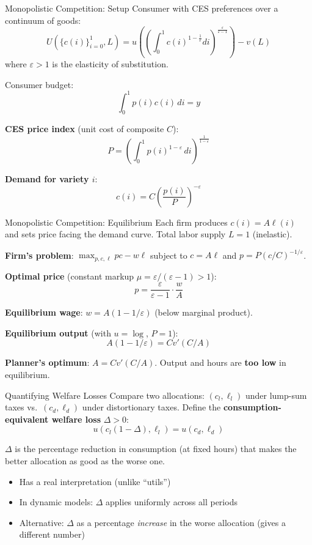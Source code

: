 \documentclass[blue]{beamer}
\begin{document}
\begin{frame}{Monopolistic Competition: Setup}
	Consumer with CES preferences over a continuum of goods:
	\[
	U\!\left(\{c(i)\}_{i=0}^1, L\right) = u\!\left(\left(\int_0^1 c(i)^{1-\frac{1}{\varepsilon}} di\right)^{\frac{\varepsilon}{\varepsilon-1}}\right) - v(L)
	\]
	where $\varepsilon > 1$ is the elasticity of substitution.
	
	
	Consumer budget: 
	$$
	\int_0^1 p(i) c(i) \, di = y
	$$
	

	\textbf{CES price index} (unit cost of composite $C$):
	\[
	P = \left(\int_0^1 p(i)^{1-\varepsilon} \, di\right)^{\frac{1}{1-\varepsilon}}
	\]
	
	\textbf{Demand for variety $i$}:
	\[
	c(i) = C \left(\frac{p(i)}{P}\right)^{-\varepsilon}
	\]
\end{frame}

\begin{frame}{Monopolistic Competition: Equilibrium}
	Each firm produces $c(i) = A\ell(i)$ and sets price facing the demand curve. Total labor supply $L = 1$ (inelastic).
	

	\textbf{Firm's problem}: $\max_{p,c,\ell} pc - w\ell$ subject to $c = A\ell$ and $p = P(c/C)^{-1/\varepsilon}$.
	

	\textbf{Optimal price} (constant markup $\mu = \varepsilon/(\varepsilon-1) > 1$):
	\[
	p = \frac{\varepsilon}{\varepsilon - 1} \cdot \frac{w}{A}
	\]
	
	\textbf{Equilibrium wage}: $w = A(1 - 1/\varepsilon)$ (below marginal product).
	

	\textbf{Equilibrium output} (with $u = \log$, $P = 1$):
	\[
	A(1 - 1/\varepsilon) = C v'(C/A)
	\]
	
	\textbf{Planner's optimum}: $A = C v'(C/A)$. Output and hours are \textbf{too low} in equilibrium.
\end{frame}

\begin{frame}{Quantifying Welfare Losses}
	Compare two allocations: $(c_l, \ell_l)$ under lump-sum taxes vs.\ $(c_d, \ell_d)$ under distortionary taxes. Define the \textbf{consumption-equivalent welfare loss} $\Delta > 0$:
	\[
	u(c_l(1 - \Delta), \ell_l) = u(c_d, \ell_d)
	\]
	
	$\Delta$ is the percentage reduction in consumption (at fixed hours) that makes the better allocation as good as the worse one.
	
	\bigskip
	\begin{itemize}
		\item Has a real interpretation (unlike ``utils'')
		\item In dynamic models: $\Delta$ applies uniformly across all periods
		\item Alternative: $\Delta$ as a percentage \emph{increase} in the worse allocation (gives a different number)
	\end{itemize}
\end{frame}
\end{document}
